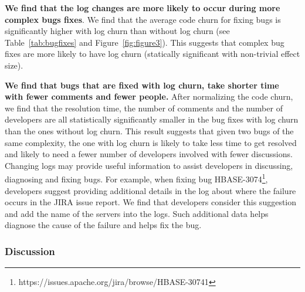 \textbf{We find that the log changes are more likely to occur during more complex bugs fixes}. We find that the average code churn for fixing bugs is significantly higher with log churn than without log churn (see Table~\ref{tab:bugfixes} and Figure~\ref{fig:figure3}). This suggests that complex bug fixes are more likely to have log churn (statically significant with non-trivial effect size). 

\textbf{We find that bugs that are fixed with log churn, take shorter time with fewer comments and fewer people.} After normalizing the code churn, we find that the resolution time, the number of comments and the number of developers are all statistically significantly smaller in the bug fixes with log churn than the ones without log churn. This result suggests that given two bugs of the same complexity, the one with log churn is likely to take less time to get resolved and likely to need a fewer number of developers involved with fewer discussions. Changing logs may provide useful information to assist developers in discussing, diagnosing and fixing bugs. For example, when fixing bug HBASE-3074\footnote{https://issues.apache.org/jira/browse/HBASE-30741}, developers suggest providing additional details in the log about where the failure occurs in the JIRA issue report. We find that developers consider this suggestion and add the name of the servers into the logs. Such additional data helps diagnose the cause of the failure and helps fix the bug.

\subsubsection*{Discussion}




